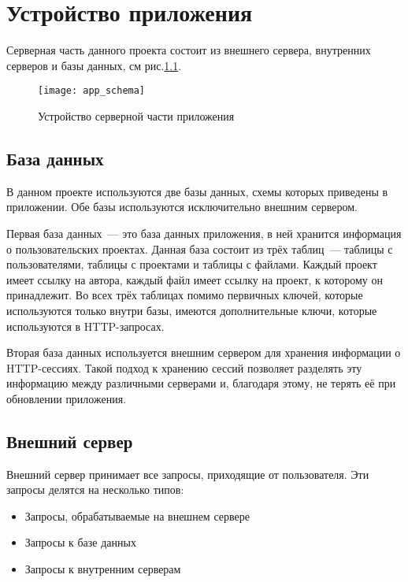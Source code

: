 \chapter{Устройство приложения}
	Серверная часть данного проекта состоит из внешнего сервера, внутренних серверов и базы данных, см рис.\ref{fig:app_schema}.
\begin{figure}[h]
	\begin{center}
	\texttt{[image: app\_schema]}
	\end{center}
	\caption{Устройство серверной части приложения}
	\label{fig:app_schema}
\end{figure}	


\section{База данных}
	В данном проекте используются две базы данных, схемы которых приведены в приложении. Обе базы используются исключительно внешним сервером.
	
	Первая база данных~--- это база данных приложения, в ней хранится информация о пользовательских проектах. Данная база состоит из трёх таблиц~--- таблицы с пользователями, таблицы с проектами и таблицы с файлами. Каждый проект имеет ссылку на автора, каждый файл имеет ссылку на проект, к которому он принадлежит. 
Во всех трёх таблицах помимо первичных ключей, которые используются только внутри базы, имеются дополнительные ключи, которые используются в HTTP-запросах.
	
	Вторая база данных используется внешним сервером для хранения информации о HTTP-сессиях. Такой подход к хранению сессий позволяет разделять эту информацию между различными серверами и, благодаря этому, не терять её при обновлении приложения. 

	
\section{Внешний сервер}
	Внешний сервер принимает все запросы, приходящие от пользователя. Эти запросы делятся на несколько типов:
\begin{itemize}
	\item Запросы, обрабатываемые на внешнем сервере
	\item Запросы  к базе данных
	\item Запросы к внутренним серверам
\end{itemize}

